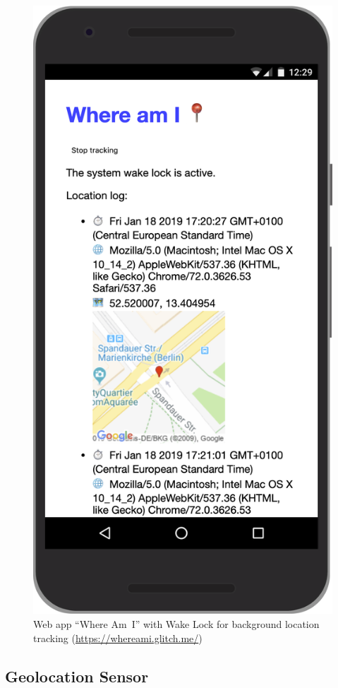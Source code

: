 \documentclass[sigconf,hyphens]{acmart}
\begin{document}
\begin{figure}[h]
  \includegraphics[width=0.55\columnwidth]{whereami.png}
  \caption{Web app ``Where Am~I''
    with Wake Lock for background location tracking (\url{https://whereami.glitch.me/})}
  \label{fig:wakelock}  
\end{figure}

\subsection{Geolocation Sensor}
\end{document}
